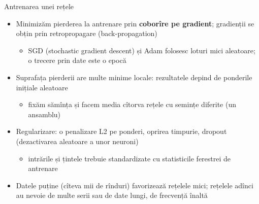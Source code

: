 \begin{frame}{Antrenarea unei rețele}
\itemsize{\small}
\begin{itemize}
    \item Minimizăm pierderea la antrenare prin \textbf{coborîre pe gradient}; gradienții se obțin prin retropropagare (back-propagation) 
    \begin{itemize}
        \item SGD (stochastic gradient descent) și Adam folosesc loturi mici aleatoare; o trecere prin date este o epocă
    \end{itemize}
    \item Suprafața pierderii are multe minime locale: rezultatele depind de ponderile inițiale aleatoare
    \begin{itemize}
        \item fixăm sămînța și facem media cîtorva rețele cu semințe diferite (un ansamblu)
    \end{itemize}
    \item Regularizare: o penalizare L2 pe ponderi, oprirea timpurie, dropout (dezactivarea aleatoare a unor neuroni)
    \begin{itemize}
        \item intrările și țintele trebuie standardizate cu statisticile ferestrei de antrenare
    \end{itemize}
    \item Datele puține (cîteva mii de rînduri) favorizează rețelele mici; rețelele adînci au nevoie de multe serii sau de date lungi, de frecvență înaltă
\end{itemize}
\end{frame}

